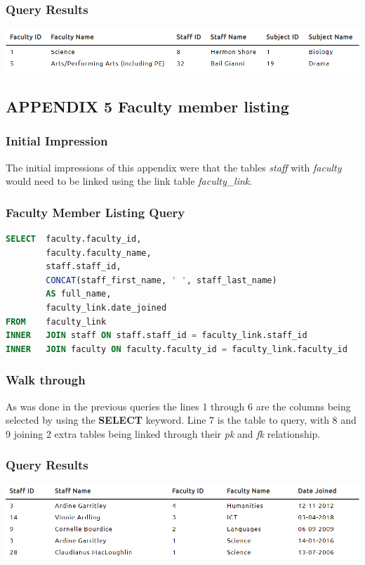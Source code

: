 \documentclass{article}
\begin{document}
\subsubsection{Query Results}
\includegraphics[width=\linewidth]{images/04.png}


\subsection{APPENDIX 5 Faculty member listing}
\subsubsection{Initial Impression} The initial impressions of this appendix were that the tables \textit{staff} with \textit{faculty} would need to be linked using the link table \textit{faculty\_link}.

\subsubsection{Faculty Member Listing Query}
\begin{lstlisting}[language=sql, caption=Faculty Member Listing Query, style=mystyle]
SELECT  faculty.faculty_id, 
        faculty.faculty_name, 
        staff.staff_id, 
        CONCAT(staff_first_name, ' ', staff_last_name) 
        AS full_name, 
        faculty_link.date_joined 
FROM    faculty_link
INNER   JOIN staff ON staff.staff_id = faculty_link.staff_id
INNER   JOIN faculty ON faculty.faculty_id = faculty_link.faculty_id
\end{lstlisting}

\subsubsection{Walk through} As was done in the previous queries the lines 1 through 6 are the columns being selected by using the \textbf{SELECT} keyword. Line 7 is the table to query, with 8 and 9 joining 2 extra tables being linked through their \textit{\acrshort{pk}} and \textit{\acrshort{fk}} relationship.

\subsubsection{Query Results}
\includegraphics[width=\linewidth]{images/05.png}
\end{document}

